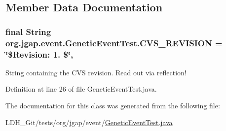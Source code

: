 \subsection{Member Data Documentation}
\hypertarget{classorg_1_1jgap_1_1event_1_1_genetic_event_test_acb42dca9601b0fb5b6430b1d4a5dd3ad}{
\subsubsection[{C\-V\-S\-\_\-\-R\-E\-V\-I\-S\-I\-O\-N}]{\setlength{\rightskip}{0pt plus 5cm}final String org.\-jgap.\-event.\-Genetic\-Event\-Test.\-C\-V\-S\-\_\-\-R\-E\-V\-I\-S\-I\-O\-N = \char`\"{}\$Revision\-: 1. \$\char`\"{}\hspace{0.3cm}{\ttfamily [static]}, {\ttfamily [private]}}}\label{classorg_1_1jgap_1_1event_1_1_genetic_event_test_acb42dca9601b0fb5b6430b1d4a5dd3ad}
String containing the C\-V\-S revision. Read out via reflection! 

Definition at line 26 of file Genetic\-Event\-Test.\-java.



The documentation for this class was generated from the following file\-:\begin{DoxyCompactItemize}
\item 
L\-D\-H\-\_\-\-Git/tests/org/jgap/event/\hyperlink{_genetic_event_test_8java}{Genetic\-Event\-Test.\-java}\end{DoxyCompactItemize}
